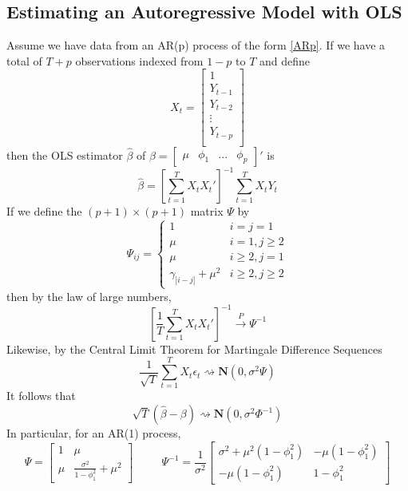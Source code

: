 \documentclass[11pt]{article}
\begin{document}
\subsection{Estimating an Autoregressive Model with OLS}
Assume we have data from an AR(p) process of the form \eqref{ARp}. If we have a total of $T+p$ observations indexed from $1-p$ to $T$ and define
\begin{equation}
X_t = \begin{bmatrix}
1 \\
Y_{t-1} \\
Y_{t-2} \\
\vdots \\
Y_{t-p} \\
\end{bmatrix}
\end{equation}
then the OLS estimator $\widehat{\beta}$ of $\beta = \left[ \begin{matrix}
\mu & \phi_1 & ... & \phi_p
\end{matrix}\right]'$  is
\begin{equation}
\widehat{\beta} = \left[ \sum_{t=1}^T X_t X_t' \right]^{-1} \sum_{t=1}^T X_t Y_t
\end{equation}
If we define the $(p+1) \times (p+1)$ matrix $\Psi$ by
\begin{equation}
\Psi_{ij} = \left\{\begin{matrix}
1 & i = j = 1 \\ 
\mu & i=1 , j \geq 2 \\
\mu &  i \geq 2, j = 1 \\
\gamma_{|i-j|} + \mu^2 & i \geq 2, j \geq 2
\end{matrix}\right.
\end{equation}
then by the law of large numbers,
\begin{equation}
\left[ \frac{1}{T} \sum_{t=1}^T X_t X_t' \right]^{-1} \overset{P}{\rightarrow} \Psi^{-1}  
\end{equation}
Likewise, by the Central Limit Theorem for Martingale Difference Sequences
\begin{equation}
\frac{1}{\sqrt{T}} \sum_{t=1}^T X_t \epsilon_t \rightsquigarrow \mathbf{N} \left( 0 , \sigma^2 \Psi \right)
\end{equation}
It follows that
\begin{equation}
\sqrt{T} \left( \widehat{\beta} - \beta \right) \rightsquigarrow \mathbf{N} \left( 0 , \sigma^2 \Phi^{-1} \right)
\end{equation}
In particular, for an AR(1) process,
\begin{equation}
\Psi = \left[
\begin{matrix}
1 & \mu \\
\mu & \frac{\sigma^2}{1 - \phi_1^2} + \mu^2
\end{matrix}
\right]
\;\;\;\;\;\;\;\;\;
\Psi^{-1} = \frac{1}{\sigma^2} \left[
\begin{matrix}
\sigma^2 + \mu^2 \left( 1 - \phi_1^2 \right) &
- \mu \left( 1 - \phi_1^2 \right) \\
- \mu \left( 1 - \phi_1^2 \right) &
1 - \phi_1^2
\end{matrix}
\right]
\end{equation}
\end{document}
